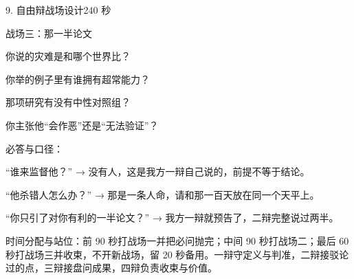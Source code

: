 \documentclass[script,pro]{debate}
\begin{document}
\begin{stage}{9. 自由辩战场设计}{240 秒}
\begin{battleground}{战场三：那一半论文}
\begin{bullets}
\item 你说的灾难是和哪个世界比？
\item 你举的例子里有谁拥有超常能力？
\item 那项研究有没有中性对照组？
\item 你主张他“会作恶”还是“无法验证”？
\end{bullets}
必答与口径：

\begin{bullets}
\item “谁来监督他？” → 没有人，这是我方一辩自己说的，前提不等于结论。
\item “他杀错人怎么办？” → 那是一条人命，请和那一百天放在同一个天平上。
\item “你只引了对你有利的一半论文？” → 我方一辩就预告了，二辩完整说过两半。
\end{bullets}
时间分配与站位：前 90 秒打战场一并把必问抛完；中间 90 秒打战场二；最后 60 秒打战场三并收束，不开新战场，留 20 秒备用。一辩守定义与判准，二辩接驳论过的点，三辩接盘问成果，四辩负责收束与价值。

\end{battleground}
\end{stage}
\end{document}
